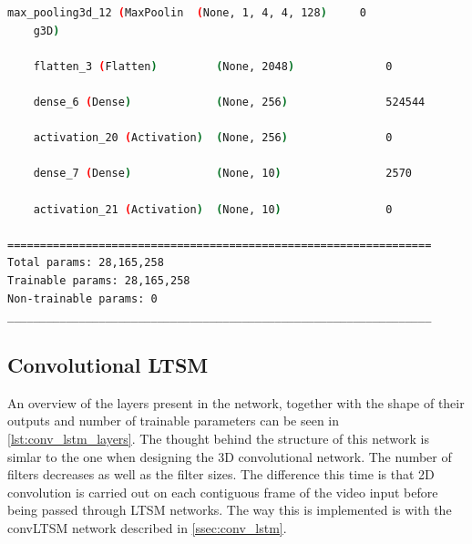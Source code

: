 \begin{lstlisting}[language=Bash,caption={Overview of layers in 3D convolutional network},label={lst:3d_conv_layers},numbers=none,float=htb]
    max_pooling3d_12 (MaxPoolin  (None, 1, 4, 4, 128)     0         
    g3D)                                                            
                                                                    
    flatten_3 (Flatten)         (None, 2048)              0         
                                                                    
    dense_6 (Dense)             (None, 256)               524544    
                                                                    
    activation_20 (Activation)  (None, 256)               0         
                                                                    
    dense_7 (Dense)             (None, 10)                2570      
                                                                    
    activation_21 (Activation)  (None, 10)                0         
                                                                    
=================================================================
Total params: 28,165,258
Trainable params: 28,165,258
Non-trainable params: 0
_________________________________________________________________
\end{lstlisting}

\subsection{Convolutional LTSM}

An overview of the layers present in the network, together with the shape of their outputs and number of trainable parameters can be seen in \cref{lst:conv_lstm_layers}. The thought behind the structure of this network is simlar to the one when designing the 3D convolutional network. The number of filters decreases as well as the filter sizes. The difference this time is that 2D convolution is carried out on each contiguous frame of the video input before being passed through LTSM networks. The way this is implemented is with the convLTSM network described in \cref{ssec:conv_lstm}.

